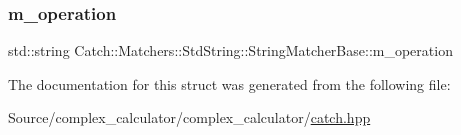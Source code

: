 \subsubsection{\texorpdfstring{m\+\_\+operation}{m\_operation}}
{\footnotesize\ttfamily std\+::string Catch\+::\+Matchers\+::\+Std\+String\+::\+String\+Matcher\+Base\+::m\+\_\+operation}



The documentation for this struct was generated from the following file\+:\begin{DoxyCompactItemize}
\item 
Source/complex\+\_\+calculator/complex\+\_\+calculator/\mbox{\hyperlink{catch_8hpp}{catch.\+hpp}}\end{DoxyCompactItemize}
